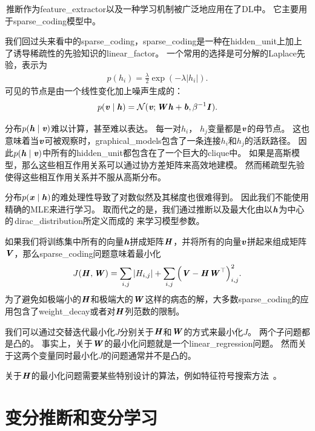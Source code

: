 \,推断作为\gls{feature_extractor}以及一种学习机制被广泛地应用在了\gls{DL}中。
它主要用于\gls{sparse_coding}模型中。


我们回过头来看中的\gls{sparse_coding}，\gls{sparse_coding}是一种在\gls{hidden_unit}上加上了诱导稀疏性的先验知识的\gls{linear_factor}。
一个常用的选择是可分解的Laplace先验，表示为
\begin{align}
	p(h_i) = \frac{\lambda}{2}  \exp(-\lambda \vert h_i \vert).
\end{align}
可见的节点是由一个线性变化加上噪声生成的：
\begin{align}
p(\boldsymbol{\mathit{v}}\mid\boldsymbol{\mathit{h}}) = \mathcal{N}(\boldsymbol{\mathit{v}};{\boldsymbol{\mathit{W}}}\boldsymbol{\mathit{h}} + \boldsymbol{\mathit{b}},\beta^{-1}{\boldsymbol{\mathit{I}}}).
\end{align}


分布$p(\boldsymbol{\mathit{h}}\mid\boldsymbol{\mathit{v}})$难以计算，甚至难以表达。
每一对$h_i$， $h_j$变量都是$\boldsymbol{\mathit{v}}$的母节点。
这也意味着当$\boldsymbol{\mathit{v}}$可被观察时，\gls{graphical_models}包含了一条连接$h_i$和$h_j$的活跃路径。
因此$p(\boldsymbol{\mathit{h}} \mid\boldsymbol{\mathit{v}})$中所有的\gls{hidden_unit}都包含在了一个巨大的\gls{clique}中。
如果是高斯模型，那么这些相互作用关系可以通过协方差矩阵来高效地建模。
然而稀疏型先验使得这些相互作用关系并不服从高斯分布。


分布$p(\boldsymbol{\mathit{x}}\mid\boldsymbol{\mathit{h}})$的难处理性导致了对数似然及其梯度也很难得到。
因此我们不能使用精确的\gls{MLE}来进行学习。
取而代之的是，我们通过推断以及最大化由以$\boldsymbol{\mathit{h}}$为中心的\,\gls{dirac_distribution}所定义而成的\,\,来学习模型参数。


如果我们将训练集中所有的向量$\boldsymbol{\mathit{h}}$拼成矩阵$\boldsymbol{\mathit{H}}$，并将所有的向量$\boldsymbol{\mathit{v}}$拼起来组成矩阵$\boldsymbol{\mathit{V}}$，那么\gls{sparse_coding}问题意味着最小化
\begin{align}
	J(\boldsymbol{\mathit{H}},\boldsymbol{\mathit{W}}) = \sum_{i,j}^{}\vert H_{i,j}\vert + \sum_{i,j}^{}\Big(\boldsymbol{\mathit{V}} - \boldsymbol{\mathit{H}} \boldsymbol{\mathit{W}}^{\top}\Big)^2_{i,j}.
\end{align}
为了避免如极端小的$\boldsymbol{\mathit{H}}$和极端大的$\boldsymbol{\mathit{W}}$这样的病态的解，大多数\gls{sparse_coding}的应用包含了\gls{weight_decay}或者对$\boldsymbol{\mathit{H}}$列范数的限制。


我们可以通过交替迭代最小化$J$分别关于$\boldsymbol{\mathit{H}}$和$\boldsymbol{\mathit{W}}$的方式来最小化$J$。
两个子问题都是凸的。
事实上，关于$\boldsymbol{\mathit{W}}$的最小化问题就是一个\gls{linear_regression}问题。
然而关于这两个变量同时最小化$J$的问题通常并不是凸的。


关于$\boldsymbol{\mathit{H}}$的最小化问题需要某些特别设计的算法，例如特征符号搜索方法~\citep{HonglakLee-2007}。


\section{变分推断和变分学习}
\label{sec:variational_inference_and_learning}


